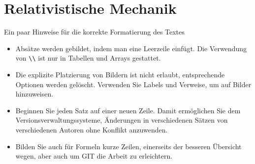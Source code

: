 %
%
%
%
\chapter{Relativistische Mechanik\label{chapter:relativ}}
\begin{refsection}

Ein paar Hinweise für die korrekte Formatierung des Textes
\begin{itemize}
\item
Absätze werden gebildet, indem man eine Leerzeile einfügt.
Die Verwendung von \verb+\\+ ist nur in Tabellen und Arrays gestattet.
\item
Die explizite Platzierung von Bildern ist nicht erlaubt, entsprechende
Optionen werden gelöscht. 
Verwenden Sie Labels und Verweise, um auf Bilder hinzuweisen.
\item
Beginnen Sie jeden Satz auf einer neuen Zeile. 
Damit ermöglichen Sie dem Versionsverwaltungssysteme, Änderungen
in verschiedenen Sätzen von verschiedenen Autoren ohne Konflikt 
anzuwenden.
\item 
Bilden Sie auch für Formeln kurze Zeilen, einerseits der besseren
Übersicht wegen, aber auch um GIT die Arbeit zu erleichtern.
\end{itemize}






\printbibliography[heading=subbibliography]
\end{refsection}
